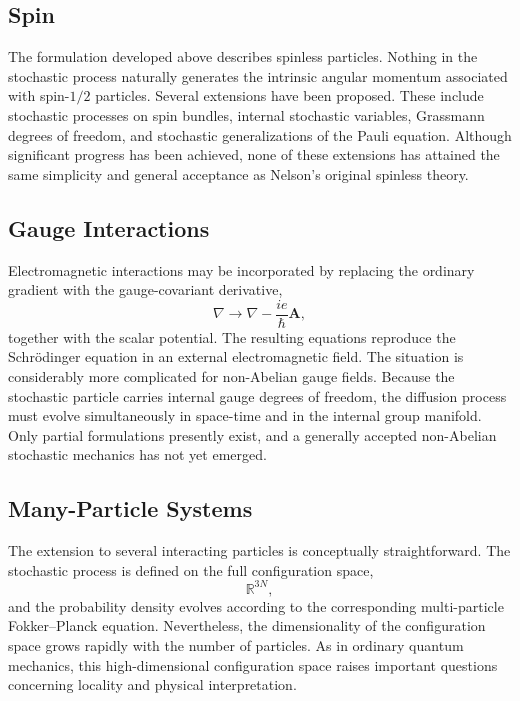 \subsection{Spin}
The formulation developed above describes spinless particles.
Nothing in the stochastic process naturally generates the intrinsic
angular momentum associated with spin-$1/2$ particles.
Several extensions have been proposed.
These include stochastic processes on spin bundles,
internal stochastic variables,
Grassmann degrees of freedom,
and stochastic generalizations of the Pauli equation.
Although significant progress has been achieved, none of these
extensions has attained the same simplicity and general acceptance as
Nelson's original spinless theory.
\subsection{Gauge Interactions}
Electromagnetic interactions may be incorporated by replacing the
ordinary gradient with the gauge-covariant derivative,
\[\nabla\rightarrow\nabla-\frac{ie}{\hbar}\mathbf A,\]
together with the scalar potential.
The resulting equations reproduce the Schrödinger equation in an
external electromagnetic field.
The situation is considerably more complicated for non-Abelian gauge
fields.
Because the stochastic particle carries internal gauge degrees of
freedom, the diffusion process must evolve simultaneously in space-time
and in the internal group manifold.
Only partial formulations presently exist, and a generally accepted
non-Abelian stochastic mechanics has not yet emerged.
\subsection{Many-Particle Systems}
The extension to several interacting particles is conceptually
straightforward.
The stochastic process is defined on the full configuration space,
\[\mathbb R^{3N},\]
and the probability density evolves according to the corresponding
multi-particle Fokker--Planck equation.
Nevertheless, the dimensionality of the configuration space grows
rapidly with the number of particles.
As in ordinary quantum mechanics, this high-dimensional configuration
space raises important questions concerning locality and physical
interpretation.
